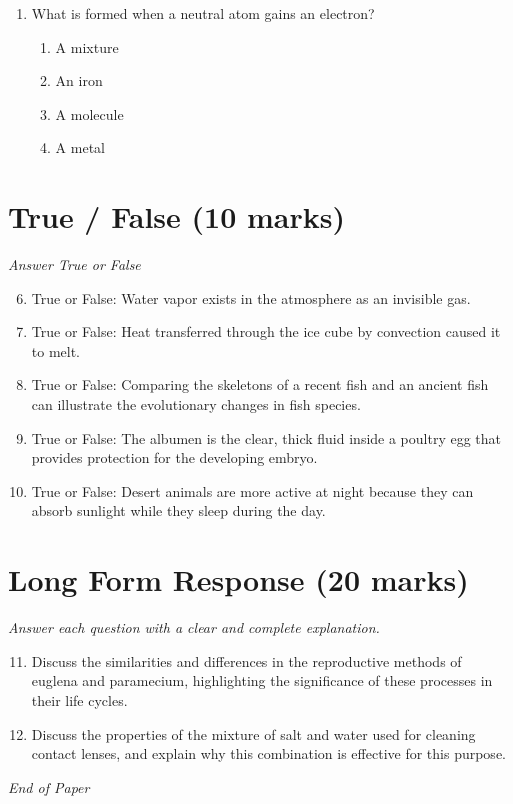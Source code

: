 \documentclass[12pt]{article}
\begin{document}
\begin{enumerate}[label=\arabic*.]
\begin{enumerate}[label=(\alph*)]
    \item neutralize the solution with a base
    \item dilute the solution with more acid
    \item absorb the liquid with paper towels
\end{enumerate}
\item What is formed when a neutral atom gains an electron?
\begin{enumerate}[label=(\alph*)]
    \item A mixture
    \item An iron
    \item A molecule
    \item A metal
\end{enumerate}
\end{enumerate}

\section*{True / False (10 marks)}
\textit{Answer True or False}
\begin{enumerate}[label=\arabic*.]
\setcounter{enumi}{5}
\item True or False: Water vapor exists in the atmosphere as an invisible gas.
\item True or False: Heat transferred through the ice cube by convection caused it to melt.
\item True or False: Comparing the skeletons of a recent fish and an ancient fish can illustrate the evolutionary changes in fish species.
\item True or False: The albumen is the clear, thick fluid inside a poultry egg that provides protection for the developing embryo.
\item True or False: Desert animals are more active at night because they can absorb sunlight while they sleep during the day.
\end{enumerate}

\section*{Long Form Response (20 marks)}
\textit{Answer each question with a clear and complete explanation.}
\begin{enumerate}[label=\arabic*.]
\setcounter{enumi}{10}
\item Discuss the similarities and differences in the reproductive methods of euglena and paramecium, highlighting the significance of these processes in their life cycles.
\item Discuss the properties of the mixture of salt and water used for cleaning contact lenses, and explain why this combination is effective for this purpose.
\end{enumerate}

\vfill
\noindent\textit{End of Paper}
\end{document}
